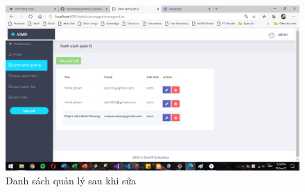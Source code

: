 \documentclass[a4paper, 12pt]{article}
\begin{document}
\begin{itemize}
\begin{itemize}
			\begin{figure}[H]
				\begin{center}
					\includegraphics[scale=0.5]{./image/demo_adminEditManager2.png}
					\caption{Danh sách quản lý sau khi sửa }
				\end{center}
			\end{figure}
	\end{itemize}
\end{itemize}
\end{document}
